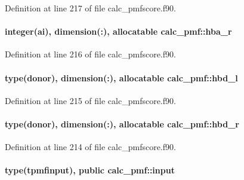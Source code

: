 Definition at line 217 of file calc\-\_\-pmfscore.\-f90.

\hypertarget{classcalc__pmf_a72d401bd03d18040c3238d42a07b895c}{
\paragraph[{hba\-\_\-r}]{\setlength{\rightskip}{0pt plus 5cm}integer(ai), dimension(\-:), allocatable calc\-\_\-pmf\-::hba\-\_\-r}}\label{classcalc__pmf_a72d401bd03d18040c3238d42a07b895c}


Definition at line 216 of file calc\-\_\-pmfscore.\-f90.

\hypertarget{classcalc__pmf_af9825de03053e01cf7ac2ac17545a509}{
\paragraph[{hbd\-\_\-l}]{\setlength{\rightskip}{0pt plus 5cm}type({\bf donor}), dimension(\-:), allocatable calc\-\_\-pmf\-::hbd\-\_\-l}}\label{classcalc__pmf_af9825de03053e01cf7ac2ac17545a509}


Definition at line 215 of file calc\-\_\-pmfscore.\-f90.

\hypertarget{classcalc__pmf_a815659caae16f7d11ba50b53fad2ee87}{
\paragraph[{hbd\-\_\-r}]{\setlength{\rightskip}{0pt plus 5cm}type({\bf donor}), dimension(\-:), allocatable calc\-\_\-pmf\-::hbd\-\_\-r}}\label{classcalc__pmf_a815659caae16f7d11ba50b53fad2ee87}


Definition at line 214 of file calc\-\_\-pmfscore.\-f90.

\hypertarget{classcalc__pmf_a05d3af4e1c76e5ab7f299b7db6d74cac}{
\paragraph[{input}]{\setlength{\rightskip}{0pt plus 5cm}type({\bf tpmfinput}), public calc\-\_\-pmf\-::input}}\label{classcalc__pmf_a05d3af4e1c76e5ab7f299b7db6d74cac}


